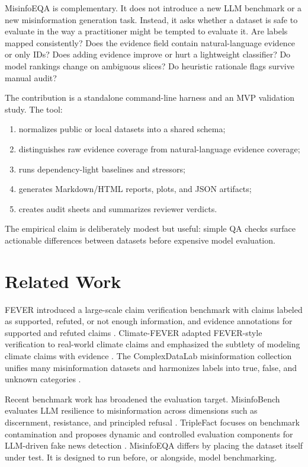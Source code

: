 \documentclass[11pt]{article}
\begin{document}
MisinfoEQA is complementary. It does not introduce a new LLM benchmark or a new
misinformation generation task. Instead, it asks whether a dataset is safe to
evaluate in the way a practitioner might be tempted to evaluate it. Are labels
mapped consistently? Does the evidence field contain natural-language evidence
or only IDs? Does adding evidence improve or hurt a lightweight classifier? Do
model rankings change on ambiguous slices? Do heuristic rationale flags survive
manual audit?

The contribution is a standalone command-line harness and an MVP validation
study. The tool:

\begin{enumerate}
  \item normalizes public or local datasets into a shared schema;
  \item distinguishes raw evidence coverage from natural-language evidence coverage;
  \item runs dependency-light baselines and stressors;
  \item generates Markdown/HTML reports, plots, and JSON artifacts;
  \item creates audit sheets and summarizes reviewer verdicts.
\end{enumerate}

The empirical claim is deliberately modest but useful: simple QA checks surface
actionable differences between datasets before expensive model evaluation.

\section{Related Work}

FEVER introduced a large-scale claim verification benchmark with claims labeled
as supported, refuted, or not enough information, and evidence annotations for
supported and refuted claims \cite{thorne2018fever}. Climate-FEVER adapted
FEVER-style verification to real-world climate claims and emphasized the
subtlety of modeling climate claims with evidence \cite{diggelmann2020climatefever}.
The ComplexDataLab misinformation collection unifies many misinformation
datasets and harmonizes labels into true, false, and unknown categories
\cite{thibault2025guide,complexdatalab2025misinfo}.

Recent benchmark work has broadened the evaluation target. MisinfoBench
evaluates LLM resilience to misinformation across dimensions such as
discernment, resistance, and principled refusal \cite{yang2025misinfobench}.
TripleFact focuses on benchmark contamination and proposes dynamic and
controlled evaluation components for LLM-driven fake news detection
\cite{xu2025triplefact}. MisinfoEQA differs by placing the dataset itself under
test. It is designed to run before, or alongside, model benchmarking.
\end{document}
